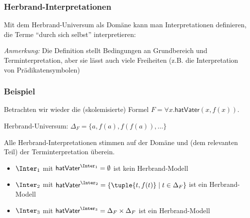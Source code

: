 \documentclass[aspectratio=1610,onlymath]{beamer}
\begin{document}
\begin{frame}\frametitle{Herbrand-Interpretationen}

Mit dem Herbrand-Universum als Domäne kann man Interpretationen definieren, die Terme "`durch sich selbst"' interpretieren:\medskip


\emph{Anmerkung:} Die Definition stellt Bedingungen an Grundbereich und Terminterpretation, aber sie lässt auch viele Freiheiten (z.B. die Interpretation von Prädikatensymbolen)

\end{frame}

\begin{frame}\frametitle{Beispiel}

Betrachten wir wieder die (skolemisierte) Formel $F=\forall x.\textsf{hatVater}(x,f(x))$.\bigskip

Herbrand-Universum: $\Delta_F=\{a,f(a),f(f(a)),\ldots\}$\medskip

Alle Herbrand-Interpretationen stimmen auf der Domäne und (dem relevanten Teil) der Terminterpretation überein.
\begin{itemize}
\item $\Inter_1$ mit $\textsf{hatVater}^{\Inter_1}=\emptyset$ ist kein Herbrand-Modell
\item $\Inter_2$ mit $\textsf{hatVater}^{\Inter_2}=\{\tuple{t,f(t)}\mid t\in\Delta_F\}$ ist ein Herbrand-Modell
\item $\Inter_3$ mit $\textsf{hatVater}^{\Inter_3}=\Delta_F\times\Delta_F$ ist ein Herbrand-Modell
\end{itemize}

\end{frame}
\end{document}
